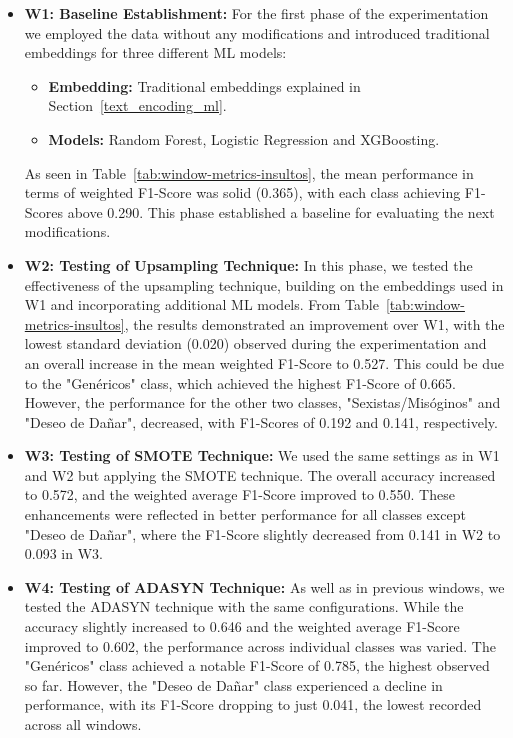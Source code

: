 \begin{itemize}
    \item \textbf{W1: Baseline Establishment:} For the first phase of the experimentation we employed the data without any modifications and introduced traditional embeddings for three different ML models:
        \begin{itemize}
             \item \textbf{Embedding:} Traditional embeddings explained in Section~\ref{text_encoding_ml}.
             \item \textbf{Models:} Random Forest, Logistic Regression and XGBoosting.
        \end{itemize}
   As seen in Table~\ref{tab:window-metrics-insultos}, the mean performance in terms of weighted F1-Score was solid (0.365), with each class achieving F1-Scores above 0.290. This phase established a baseline for evaluating the next modifications.

    \newpage
    
    \item \textbf{W2: Testing of Upsampling Technique:} In this phase, we tested the effectiveness of the upsampling technique, building on the embeddings used in W1 and incorporating additional ML models. From Table~\ref{tab:window-metrics-insultos}, the results demonstrated an improvement over W1, with the lowest standard deviation (0.020) observed during the experimentation and an overall increase in the mean weighted F1-Score to 0.527. This could be due to the "Genéricos" class, which achieved the highest F1-Score of 0.665. However, the performance for the other two classes, "Sexistas/Misóginos" and "Deseo de Dañar", decreased, with F1-Scores of 0.192 and 0.141, respectively.


    \item \textbf{W3: Testing of SMOTE Technique:} We used the same settings as in W1 and W2 but applying the SMOTE technique. The overall accuracy increased to 0.572, and the weighted average F1-Score improved to 0.550. These enhancements were reflected in better performance for all classes except "Deseo de Dañar", where the F1-Score slightly decreased from 0.141 in W2 to 0.093 in W3. 


    \item \textbf{W4: Testing of ADASYN Technique:} As well as in previous windows, we tested the ADASYN technique with the same configurations. While the accuracy slightly increased to 0.646 and the weighted average F1-Score improved to 0.602, the performance across individual classes was varied. The "Genéricos" class achieved a notable F1-Score of 0.785, the highest observed so far. However, the "Deseo de Dañar" class experienced a decline in performance, with its F1-Score dropping to just 0.041, the lowest recorded across all windows.


\end{itemize}

